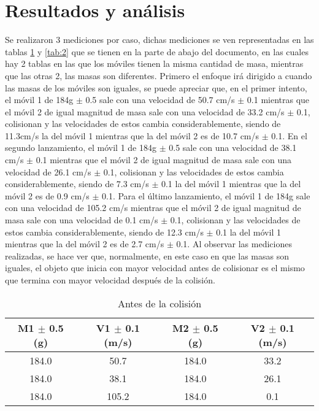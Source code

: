 \documentclass{article}
\begin{document}
\section{Resultados y análisis}\label{Resultados}			%

Se realizaron 3 mediciones por caso, dichas mediciones se ven representadas en las tablas \ref{tab:1} y \ref{tab:2} que se tienen en la parte de abajo del documento, en las cuales hay 2 tablas en las que los móviles tienen la misma cantidad de masa, mientras que las otras 2, las masas son diferentes. Primero el enfoque irá dirigido a cuando las masas de los móviles son iguales, se puede apreciar que, en el primer intento, el móvil 1 de 184g $\pm$ 0.5 sale con una velocidad de 50.7 cm/s $\pm$ 0.1 mientras que el móvil 2 de igual magnitud de masa sale con una velocidad de 33.2 cm/s $\pm$ 0.1, colisionan y las velocidades de estos cambia considerablemente, siendo de 11.3cm/s la del móvil 1 mientras que la del móvil 2 es de 10.7 cm/s $\pm$ 0.1. En el segundo lanzamiento, el móvil 1 de 184g $\pm$ 0.5 sale con una velocidad de 38.1 cm/s $\pm$ 0.1 mientras que el móvil 2 de igual magnitud de masa sale con una velocidad de 26.1 cm/s $\pm$ 0.1, colisionan y las velocidades de estos cambia considerablemente, siendo de 7.3 cm/s $\pm$ 0.1 la del móvil 1 mientras que la del móvil 2 es de 0.9 cm/s $\pm$ 0.1. Para el último lanzamiento, el móvil 1 de 184g sale con una velocidad de 105.2 cm/s mientras que el móvil 2 de igual magnitud de masa sale con una velocidad de 0.1 cm/s $\pm$ 0.1, colisionan y las velocidades de estos cambia considerablemente, siendo de 12.3 cm/s $\pm$ 0.1 la del móvil 1 mientras que la del móvil 2 es de 2.7 cm/s $\pm$ 0.1. Al observar las mediciones realizadas, se hace ver que, normalmente, en este caso en que las masas son iguales, el objeto que inicia con mayor velocidad antes de colisionar es el mismo que termina con mayor velocidad después de la colisión.

\begin{table}[H]
	\centering	
	\begin{tabular}{|c|c|c|c|}
\hline
M1 $\pm$ 0.5 (g) & V1 $\pm$ 0.1 (m/s) & M2 $\pm$ 0.5 (g) & V2 $\pm$ 0.1 (m/s) \\
\hline
184.0 & 50.7 & 184.0 & 33.2 \\
\hline
184.0 & 38.1 & 184.0 & 26.1 \\
\hline
184.0 & 105.2 & 184.0 & 0.1 \\
\hline
\end{tabular}
\caption{Antes de la colisión}
\label{tab:1}
\end{table}
\end{document}
